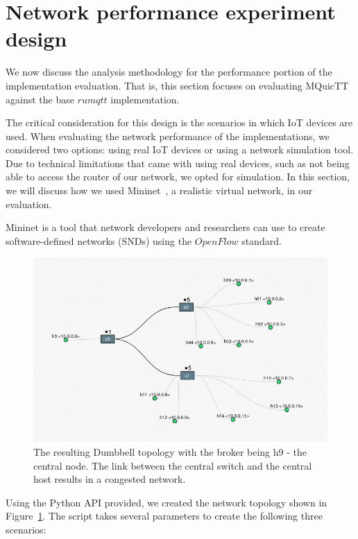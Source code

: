 \section{Network performance experiment design} \label{chap:net_sim}

We now discuss the analysis methodology for the performance portion of the implementation evaluation.
That is, this section focuses on evaluating MQuicTT against the base $rumqtt$ implementation.

The critical consideration for this design is the scenarios in which IoT devices are used.
When evaluating the network performance of the implementations, we considered two options: using real IoT devices or using a network simulation tool.
Due to technical limitations that came with using real devices, such as not being able to access the router of our network, we opted for simulation.
In this section, we will discuss how we used Mininet~\citep{lantz_mininet_2021}, a realistic virtual network, in our evaluation.

Mininet is a tool that network developers and researchers can use to create software-defined networks (SNDs) using the $OpenFlow$ standard.

\begin{figure}[ht]
    \centering
    \includegraphics[width=0.9\linewidth]{images/mininet_topo.png}
    \caption{The resulting Dumbbell topology with the broker being h9 - the central node. The link between the central switch and the central host results in a congested network.}
    \label{fig:mininet-topo}
\end{figure}

Using the Python API provided, we created the network topology shown in Figure~\ref{fig:mininet-topo}.
The script takes several parameters to create the following three scenarios:


